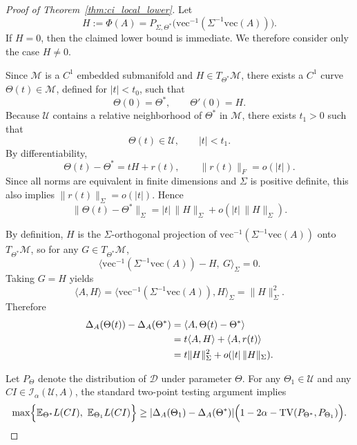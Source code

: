 \documentclass[authoryear,preprint,review,12pt]{elsarticle}
\begin{document}
\begin{proof}[Proof of Theorem~\ref{thm:ci_local_lower}]
	Let
	\[
	H:=\Phi(A)
	=
	P_{\Sigma,\Theta^\ast}\!\bigl(\mathrm{vec}^{-1}(\Sigma^{-1}\mathrm{vec}(A))\bigr).
	\]
	If $H=0$, then the claimed lower bound is immediate. We therefore consider only the case $H\neq 0$.
	
	Since $\mathcal M$ is a $C^1$ embedded submanifold and $H\in T_{\Theta^\ast}\mathcal M$, there exists a $C^1$ curve $\Theta(t)\in\mathcal M$, defined for $|t|<t_0$, such that
	\[
	\Theta(0)=\Theta^\ast,
	\qquad
	\Theta'(0)=H.
	\]
	Because $\mathcal U$ contains a relative neighborhood of $\Theta^\ast$ in $\mathcal M$, there exists $t_1>0$ such that
	\[
	\Theta(t)\in\mathcal U,
	\qquad |t|<t_1.
	\]
	By differentiability,
	\[
	\Theta(t)-\Theta^\ast=tH+r(t),
	\qquad
	\|r(t)\|_F=o(|t|).
	\]
	Since all norms are equivalent in finite dimensions and $\Sigma$ is positive definite, this also implies $\|r(t)\|_\Sigma=o(|t|)$. Hence
	\begin{equation}
		\|\Theta(t)-\Theta^\ast\|_\Sigma
		=
		|t|\,\|H\|_\Sigma+o(|t|\,\|H\|_\Sigma).
		\label{eq:ci_local_norm}
	\end{equation}
	
	By definition, $H$ is the $\Sigma$-orthogonal projection of $\mathrm{vec}^{-1}(\Sigma^{-1}\mathrm{vec}(A))$ onto $T_{\Theta^\ast}\mathcal M$, so for any $G\in T_{\Theta^\ast}\mathcal M$,
	\[
	\Big\langle \mathrm{vec}^{-1}(\Sigma^{-1}\mathrm{vec}(A))-H,\ G\Big\rangle_\Sigma=0.
	\]
	Taking $G=H$ yields
	\[
	\langle A,H\rangle
	=
	\Big\langle \mathrm{vec}^{-1}(\Sigma^{-1}\mathrm{vec}(A)),H\Big\rangle_\Sigma
	=
	\|H\|_\Sigma^2.
	\]
	Therefore
	\begin{align}
		\Delta_A(\Theta(t))-\Delta_A(\Theta^\ast)
		&=
		\langle A,\Theta(t)-\Theta^\ast\rangle \notag\\
		&=
		t\langle A,H\rangle+\langle A,r(t)\rangle \notag\\
		&=
		t\|H\|_\Sigma^2+o(|t|\,\|H\|_\Sigma).
		\label{eq:ci_local_signal}
	\end{align}
	
	Let $P_\Theta$ denote the distribution of $\mathcal D$ under parameter $\Theta$.
	For any $\Theta_1\in\mathcal U$ and any $CI\in\mathcal I_\alpha(\mathcal U,A)$, the standard two-point testing argument implies
	\begin{equation}
		\max\Bigl\{\mathbb E_{\Theta^\ast}L(CI),\ \mathbb E_{\Theta_1}L(CI)\Bigr\}
		\ge
		|\Delta_A(\Theta_1)-\Delta_A(\Theta^\ast)|
		\Bigl(1-2\alpha-\operatorname{TV}(P_{\Theta^\ast},P_{\Theta_1})\Bigr).
		\label{eq:ci_local_twopoint}
	\end{equation}
	

\end{proof}
\end{document}
